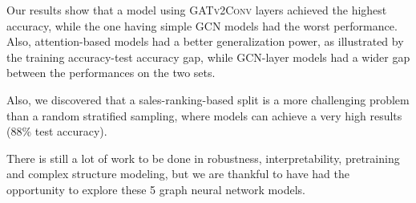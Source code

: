 \documentclass[sigconf, nonacm]{acmart}
\begin{document}
Our results show that a model using \textsc{GATv2Conv} layers \cite{Brodyetal} achieved the highest accuracy, while the one having simple \textsc{GCN} models \cite{Kipf&Welling2017} had the worst performance. Also, attention-based models had a better generalization power, as illustrated by the training accuracy-test accuracy gap, while \textsc{GCN}-layer models had a wider gap between the performances on the two sets.

Also, we discovered that a sales-ranking-based split is a more challenging problem than a random stratified sampling, where models can achieve a very high results (88\% test accuracy).

There is still a lot of work to be done in robustness, interpretability, pretraining and complex structure modeling, but we are thankful to have had the opportunity to explore these 5 graph neural network models. 

\medskip


\printbibliography
\end{document}
